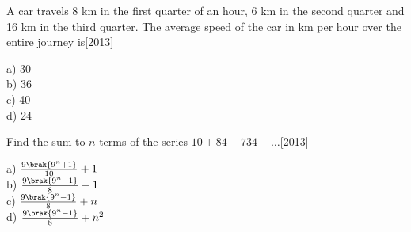 \item A car travels 8 km in the first quarter of an hour, 6 km in the second quarter and 16 km in the third quarter. The average speed of the car in km per hour over the entire journey is\hfill{[2013]}
\begin{multicols}{4}
    a) 30\\
    b) 36\\
    c) 40\\
    d) 24
\end{multicols}
\item Find the sum to $n$ terms of the series $10+84+734+\dots$\hfill{[2013]}
\begin{multicols}{4}
     a) $\frac{9\brak{9^n+1}}{10}+1$\\
     b) $\frac{9\brak{9^n-1}}{8}+1$\\
     c) $\frac{9\brak{9^n-1}}{8}+n$\\
     d) $\frac{9\brak{9^n-1}}{8}+n^2$
 \end{multicols}



